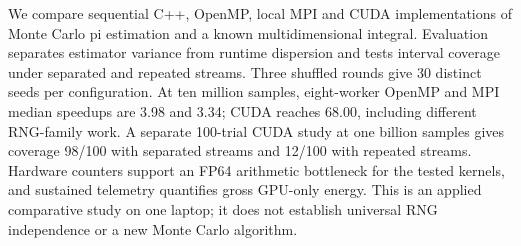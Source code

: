 We compare sequential C++, OpenMP, local MPI and CUDA implementations of
Monte Carlo pi estimation and a known multidimensional integral. Evaluation
separates estimator variance from runtime dispersion and tests interval
coverage under separated and repeated streams. Three shuffled rounds give
30 distinct seeds per configuration. At ten million samples, eight-worker
OpenMP and MPI median speedups are 3.98 and 3.34; CUDA reaches 68.00,
including different RNG-family work. A separate 100-trial CUDA study at
one billion samples gives coverage 98/100 with separated streams and 12/100
with repeated streams. Hardware counters support an FP64 arithmetic bottleneck
for the tested kernels, and sustained telemetry quantifies gross GPU-only
energy. This is an applied comparative study on one laptop; it does not
establish universal RNG independence or a new Monte Carlo algorithm.
